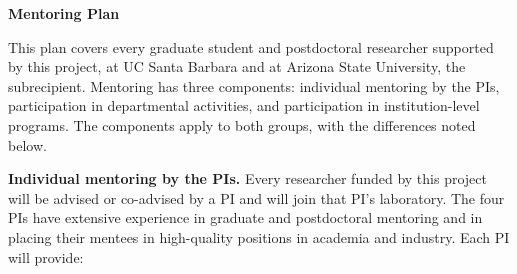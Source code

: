 \documentclass[11pt,letterpaper]{article}
\begin{document}
\begin{center}
  {\large\bfseries Mentoring Plan}
\end{center}

\vspace{0.2em}

This plan covers every graduate student and postdoctoral researcher supported
by this project, at UC Santa Barbara and at Arizona State University, the
subrecipient. Mentoring has three components: individual mentoring by the PIs,
participation in departmental activities, and participation in
institution-level programs. The components apply to both groups, with the
differences noted below.

\textbf{Individual mentoring by the PIs.}
Every researcher funded by this project will be advised or co-advised by a PI
and will join that PI's laboratory. The four PIs have extensive experience in
graduate and postdoctoral mentoring and in placing their mentees in
high-quality positions in academia and industry. Each PI will provide:
\end{document}
